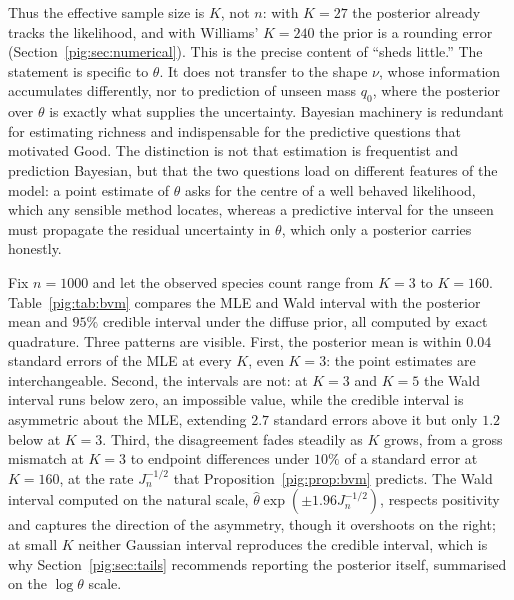 Thus the effective sample size is $K$, not $n$: with $K=27$ the posterior already tracks the likelihood, and with Williams' $K=240$ the prior is a rounding error (Section~\ref{pig:sec:numerical}). This is the precise content of ``sheds little.'' The statement is specific to $\theta$. It does not transfer to the shape $\nu$, whose information accumulates differently, nor to prediction of unseen mass $q_0$, where the posterior over $\theta$ is exactly what supplies the uncertainty. Bayesian machinery is redundant for estimating richness and indispensable for the predictive questions that motivated Good. The distinction is not that estimation is frequentist and prediction Bayesian, but that the two questions load on different features of the model: a point estimate of $\theta$ asks for the centre of a well behaved likelihood, which any sensible method locates, whereas a predictive interval for the unseen must propagate the residual uncertainty in $\theta$, which only a posterior carries honestly.

\begin{example}\label{pig:ex:bvmtable}
Fix $n=1000$ and let the observed species count range from $K=3$ to $K=160$. Table~\ref{pig:tab:bvm} compares the MLE and Wald interval with the posterior mean and $95\%$ credible interval under the diffuse prior, all computed by exact quadrature. Three patterns are visible. First, the posterior mean is within $0.04$ standard errors of the MLE at every $K$, even $K=3$: the point estimates are interchangeable. Second, the intervals are not: at $K=3$ and $K=5$ the Wald interval runs below zero, an impossible value, while the credible interval is asymmetric about the MLE, extending $2.7$ standard errors above it but only $1.2$ below at $K=3$. Third, the disagreement fades steadily as $K$ grows, from a gross mismatch at $K=3$ to endpoint differences under $10\%$ of a standard error at $K=160$, at the rate $J_n^{-1/2}$ that Proposition~\ref{pig:prop:bvm} predicts. The Wald interval computed on the natural scale, $\hat\theta\exp(\pm1.96J_n^{-1/2})$, respects positivity and captures the direction of the asymmetry, though it overshoots on the right; at small $K$ neither Gaussian interval reproduces the credible interval, which is why Section~\ref{pig:sec:tails} recommends reporting the posterior itself, summarised on the $\log\theta$ scale.
\end{example}

